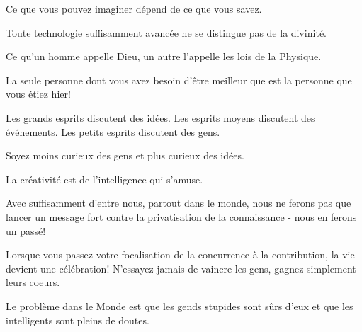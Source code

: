  	 \begin{fquote}Ce que vous pouvez imaginer dépend de ce que vous savez.
 	\end{fquote}
 	
 	\begin{fquote}Toute technologie suffisamment avancée ne se distingue pas de la divinité.
 	\end{fquote}
 	
 	\begin{fquote} Ce qu'un homme appelle Dieu, un autre l'appelle les lois de la Physique.
 	\end{fquote}
 	
 	\begin{fquote}[?]La seule personne dont vous avez besoin d'être meilleur que est la personne que vous étiez hier!
 	\end{fquote}
 	
 	\begin{fquote}Les grands esprits discutent des idées. Les esprits moyens discutent des événements. Les petits esprits discutent des gens.
 	\end{fquote}
 	
 	\begin{fquote}Soyez moins curieux des gens et plus curieux des idées.
 	\end{fquote}
 	
 	\begin{fquote}La créativité est de l'intelligence qui s'amuse.
 	\end{fquote}
 	
 	\begin{fquote}Avec suffisamment d'entre nous, partout dans le monde, nous ne ferons pas que lancer un message fort contre la privatisation de la connaissance - nous en ferons un passé!
 	\end{fquote}
 	
 	\begin{fquote}[Buddha]Lorsque vous passez votre focalisation de la concurrence à la contribution, la vie devient une célébration! N'essayez jamais de vaincre les gens, gagnez simplement leurs coeurs.
 	\end{fquote}
 	
 	\begin{fquote}Le problème dans le Monde est que les gends stupides sont sûrs d'eux et que les intelligents sont pleins de doutes.
 	\end{fquote}
 	
